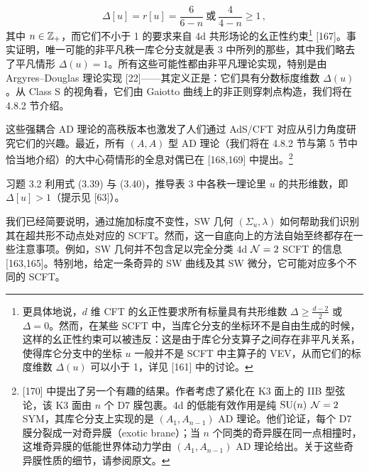 \begin{equation}
  \Delta[u] = r[u] = \frac{6}{6-n}\ \text{或}\ \frac{4}{4-n} \geqslant 1\,,
  \tag{3.41}
\end{equation}
其中 $n\in\mathbb{Z}_+$，而它们不小于 1 的要求来自 4d 共形场论的幺正性约束\footnote{更具体地说，$d$ 维 CFT 的幺正性要求所有标量具有共形维数 $\Delta\geqslant\frac{d-2}{2}$ 或 $\Delta=0$。然而，在某些 SCFT 中，当库仑分支的坐标环不是自由生成的时候，这样的幺正性约束可以被违反：这是由于库仑分支算子之间存在非平凡关系，使得库仑分支中的坐标 $u$ 一般并不是 SCFT 中主算子的 VEV，从而它们的标度维数 $\Delta(u)$ 可以小于 1，详见 [161] 中的讨论。} [167]。事实证明，唯一可能的非平凡秩一库仑分支就是表 3 中所列的那些，其中我们略去了平凡情形 $\Delta(u)=1$。所有这些可能性都由非平凡理论实现，特别是由 Argyres--Douglas 理论实现 [22]——其定义正是：它们具有分数标度维数 $\Delta(u)$。从 Class S 的视角看，它们由 Gaiotto 曲线上的非正则穿刺点构造，我们将在 4.8.2 节介绍。


这些强耦合 AD 理论的高秩版本也激发了人们通过 AdS/CFT 对应从引力角度研究它们的兴趣。最近，所有 $(A,A)$ 型 AD 理论（我们将在 4.8.2 节与第 5 节中恰当地介绍）的大中心荷情形的全息对偶已在 [168,169] 中提出。\footnote{[170] 中提出了另一个有趣的结果。作者考虑了紧化在 K3 面上的 IIB 型弦论，该 K3 面由 $n$ 个 D7 膜包裹。4d 的低能有效作用是纯 $\mathrm{SU}(n)$ $\mathcal{N}=2$ SYM，其库仑分支上实现的是 $(A_1,A_{n-1})$ AD 理论。他们论证，每个 D7 膜分裂成一对奇异膜（exotic brane）；当 $n$ 个同类的奇异膜在同一点相撞时，这堆奇异膜的低能世界体动力学由 $(A_1,A_{n-1})$ AD 理论给出。关于这些奇异膜性质的细节，请参阅原文。}

\begin{exercisebox}{习题 3.2}
利用式 (3.39) 与 (3.40)，推导表 3 中各秩一理论里 $u$ 的共形维数，即 $\Delta[u]>1$（提示见 [63]）。
\end{exercisebox}


我们已经简要说明，通过施加标度不变性，SW 几何 $(\Sigma_u,\lambda)$ 如何帮助我们识别其在超共形不动点处对应的 SCFT。然而，这一自底向上的方法自始至终都存在一些注意事项。例如，SW 几何并不包含足以完全分类 4d $\mathcal{N}=2$ SCFT 的信息 [163,165]。特别地，给定一条奇异的 SW 曲线及其 SW 微分，它可能对应多个不同的 SCFT。

